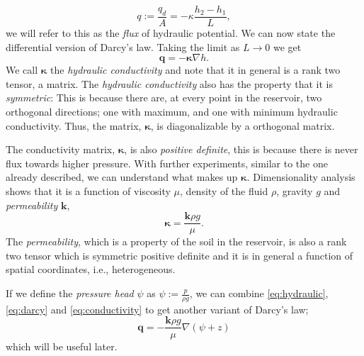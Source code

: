 \documentclass[../Main/main.tex]{subfiles}
\begin{document}
\begin{equation*}
q := \frac{q_d}{A} = -\kappa \frac{h_2-h_1}{L},
\end{equation*}
we will refer to this as the \emph{flux} of hydraulic potential. We can now state the differential version of Darcy's law. Taking the limit as $L\rightarrow 0$ we get 
\begin{equation}\label{eq:darcy}
\bm{q} = -\bm{\kappa} \nabla h.
\end{equation}
We call $\bm{\kappa}$ the \emph{hydraulic conductivity} and note that it in general is a rank two tensor, a matrix. The \emph{hydraulic conductivity} also has the property that it is \emph{symmetric}: This is because there are, at every point in the reservoir, two orthogonal directions; one with maximum, and one with minimum hydraulic conductivity. Thus, the matrix, $\bm{\kappa}$, is diagonalizable by a orthogonal matrix.\par
The conductivity matrix, $\bm{\kappa}$, is also \emph{positive definite}, this is because there is never flux towards higher pressure. 
With further experiments, similar to the one already described, we can understand what makes up $\bm{\kappa}$. Dimensionality analysis shows that it is  a function of viscosity $\mu$, density of the fluid $\rho$, gravity $g$ and \emph{permeability} $\bm{k}$,
\begin{equation} \label{eq:conductivity}
\bm{\kappa} = \frac{\bm{k} \rho g}{\mu}.
\end{equation}
The \emph{permeability}, which is a property of the soil in the reservoir, is also a rank two tensor which is symmetric positive definite and it is in general a function of spatial coordinates, i.e., heterogeneous.
\par If we define the \emph{pressure head} $\psi$ as $\psi := \frac{p}{\rho g}$, we can combine \eqref{eq:hydraulic}, \eqref{eq:darcy} and \eqref{eq:conductivity} to get another variant of Darcy's law;
\begin{equation}\label{eq:darcyv2}
\bm{q} = -\frac{\bm{k}\rho g}{\mu}\nabla(\psi + z)
\end{equation}
 which will be useful later.
\end{document}
